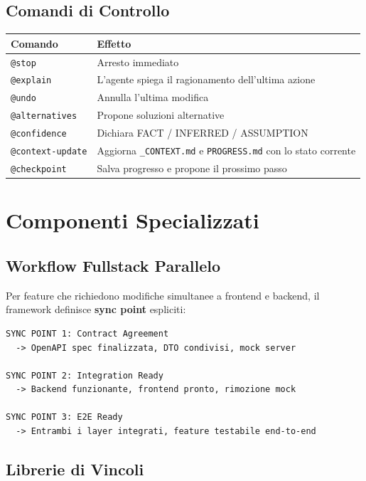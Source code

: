 \subsection{Comandi di Controllo}

\begin{center}
\begin{tabularx}{\textwidth}{l X}
\toprule
\textbf{Comando} & \textbf{Effetto} \\
\midrule
\texttt{@stop} & Arresto immediato \\
\texttt{@explain} & L'agente spiega il ragionamento dell'ultima azione \\
\texttt{@undo} & Annulla l'ultima modifica \\
\texttt{@alternatives} & Propone soluzioni alternative \\
\texttt{@confidence} & Dichiara FACT / INFERRED / ASSUMPTION \\
\texttt{@context-update} & Aggiorna \texttt{\_CONTEXT.md} e \texttt{PROGRESS.md} con lo stato corrente \\
\texttt{@checkpoint} & Salva progresso e propone il prossimo passo \\
\bottomrule
\end{tabularx}
\end{center}

\section{Componenti Specializzati}

\subsection{Workflow Fullstack Parallelo}

Per feature che richiedono modifiche simultanee a frontend e backend, il framework definisce \textbf{sync point} espliciti:

\begin{lstlisting}[language={}]
SYNC POINT 1: Contract Agreement
  -> OpenAPI spec finalizzata, DTO condivisi, mock server

SYNC POINT 2: Integration Ready
  -> Backend funzionante, frontend pronto, rimozione mock

SYNC POINT 3: E2E Ready
  -> Entrambi i layer integrati, feature testabile end-to-end
\end{lstlisting}

\subsection{Librerie di Vincoli}

